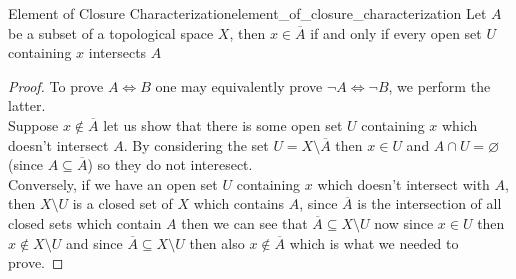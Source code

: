 \begin{proposition}{Element of Closure
Characterization}{element_of_closure_characterization}
Let \( A \) be a subset of a topological space \( X \), then
\( x \in  \overline{A}  \) if and only if every open set \( U \) containing \( x
\) intersects \( A \) 
\end{proposition}
\begin{proof}
    To prove \( A \Leftrightarrow B \) one may equivalently prove \( \neg A
    \Leftrightarrow \neg B \), we perform the latter.\\
    Suppose \( x \not\in \overline{A}  \) let us show that there is some open
    set \( U \) containing \( x \) which doesn't intersect \( A \). By
    considering the set \( U = X \setminus \overline{A}  \) then \( x \in  U \)
    and \( A \cap  U = \varnothing  \) (since \( A \subseteq \overline{A}  \))
    so they do not interesect.\\
    Conversely, if we have an open set \( U \) containing \( x \) which doesn't
    intersect with \( A\), then \( X \setminus U \) is a closed set of \( X \)
    which contains \( A \), since \( \overline{A}  \) is the intersection of all
    closed sets which contain \( A \) then we can see that \( \overline{A}
    \subseteq X \setminus U \) now since \( x \in U \) then \( x \not\in X
    \setminus U \) and since \( \overline{A} \subseteq X \setminus U \) then
    also \( x \not\in \overline{A}  \) which is what we needed to prove.
\end{proof}
